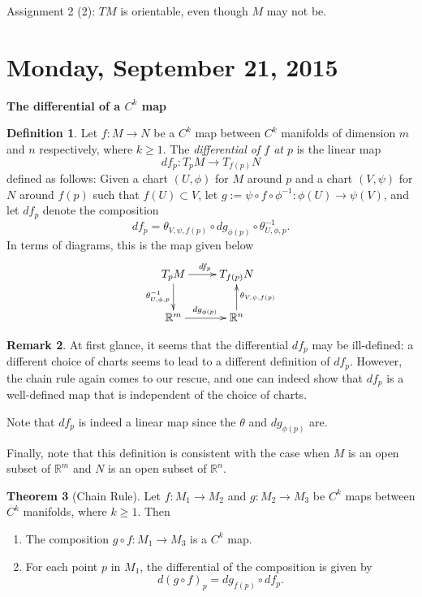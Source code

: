 \documentclass{amsart}
\numberwithin{equation}{section}
\newcommand{\bR}{\mathbb{R}}
\theoremstyle{definition}
\newtheorem{definition}{Definition} [section]
\newtheorem{remark}[definition]{Remark}
\theoremstyle{theorem}
\newtheorem{theorem}[definition]{Theorem}
\begin{document}
Assignment 2 (2): $TM$ is orientable, even though $M$ may not be.

\section{Monday, September 21, 2015}


\noindent
{\bf \large The differential of a $C^k$ map}

\begin{definition}
Let $f : M \to N$ be a $C^k$ map between $C^k$ manifolds of dimension $m$ and $n$ respectively,
where $k\geq 1$.  The {\em differential of $f$ at $p$} is the linear map 
\[
df_p : T_pM \to T_{f(p)}N
\]
defined as follows: Given a chart $(U,\phi)$ for $M$ around $p$ and a chart $(V,\psi)$ for $N$ around $f(p)$ such that 
$f(U) \subset V$, let $g:= \psi\circ f\circ \phi^{-1}:\phi(U)\to \psi(V)$, and let $df_p$ denote the composition 
\[
df_p = \theta_{V,\psi,f(p)} \circ dg_{\phi(p)} \circ \theta^{-1}_{U,\phi,p}.
\]
In terms of diagrams, this is the map given below
\[
\xymatrix{
T_pM \ar[r]^{df_p} \ar[d]_{\theta_{U,\phi,p}^{-1}} & T_{f(p)}N  \\
\mathbb{R}^m \ar[r]^{dg_{\phi(p)}} & \mathbb{R}^n \ar[u]_{\theta_{V,\psi, f(p)}}
}
\]
\end{definition}

\begin{remark}
At first glance, it seems that the differential $df_p$ may be ill-defined: a different choice of charts seems to lead to a different definition of $df_p$. However, the chain rule again comes to our rescue, and one can indeed show that $df_p$ is a well-defined map that is independent of the choice of charts. 

Note that $df_p$ is indeed a linear map since the $\theta$ and $dg_{\phi(p)}$ are. 

Finally, note that this definition is consistent with the case when $M$ is an open subset of $\bR^m$ and 
$N$ is an open subset of $\bR^n$. 
\end{remark}

\begin{theorem}[Chain Rule]
Let $f : M_1 \to M_2$ and $g : M_2 \to M_3$ be $C^k$ maps between $C^k$ manifolds, where $k\geq 1$. Then 
\begin{enumerate}
\item The composition $g \circ f : M_1 \to M_3$ is a $C^k$ map.
\item For each point $p$ in $M_1$, the differential of the composition is given by 
\[
d(g \circ f)_p = dg_{f(p)} \circ df_p.
\]
\end{enumerate}
\end{theorem}
\end{document}

